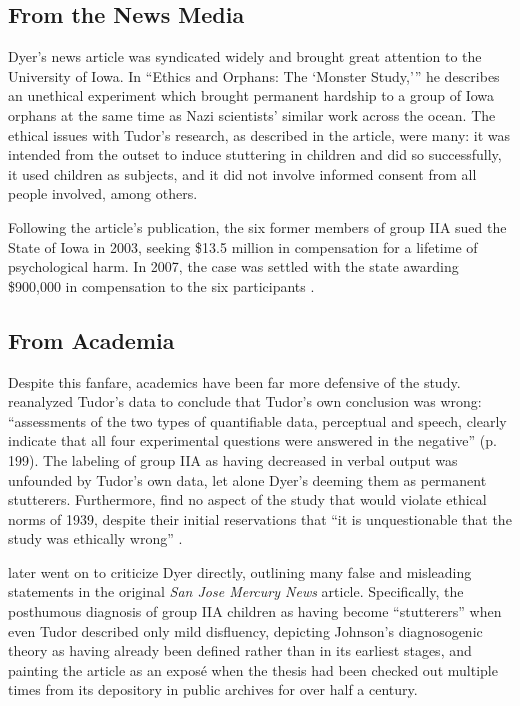 \documentclass{../../../coursework}
\begin{document}
\subsection{From the News Media}

Dyer's \parencite*{Dye01} news article was syndicated widely and brought great
attention to the University of Iowa. In ``Ethics and Orphans: The
`Monster Study,''' he describes an unethical experiment which brought
permanent hardship to a group of Iowa orphans at the same time as Nazi
scientists' similar work across the ocean. The ethical issues with
Tudor's research, as described in the article, were many: it was
intended from the outset to induce stuttering in children and did so
successfully, it used children as subjects, and it did not involve
informed consent from all people involved, among others.

Following the article's publication, the six former members of group IIA
sued the State of Iowa in 2003, seeking \$13.5 million in compensation
for a lifetime of psychological harm. In 2007, the case was settled with
the state awarding \$900,000 in compensation to the six participants
\parencite{BBC07}.

\subsection{From Academia}

Despite this fanfare, academics have been far more defensive of the
study. \textcite{Amb02} reanalyzed Tudor's data to conclude that
Tudor's own conclusion was wrong: ``assessments of the two types of
quantifiable data, perceptual and speech, clearly indicate that all four
experimental questions were answered in the negative'' (p. 199). The
labeling of group IIA as having decreased in verbal output was unfounded
by Tudor's own data, let alone Dyer's deeming them as permanent
stutterers. Furthermore, \textcite{Amb02} find no aspect of the
study that would violate ethical norms of 1939, despite their initial
reservations that ``it is unquestionable that the study was ethically
wrong'' \parencite[17]{Yai01}.

\textcite{GoldfarbEthics04} later went on to criticize Dyer directly, outlining many
false and misleading statements in the original \emph{San Jose Mercury
News} article. Specifically, the posthumous diagnosis of group IIA
children as having become ``stutterers'' when even Tudor described only
mild disfluency, depicting Johnson's diagnosogenic theory as having
already been defined rather than in its earliest stages, and painting
the article as an exposé when the thesis had been checked out multiple
times from its depository in public archives for over half a century.
\end{document}
